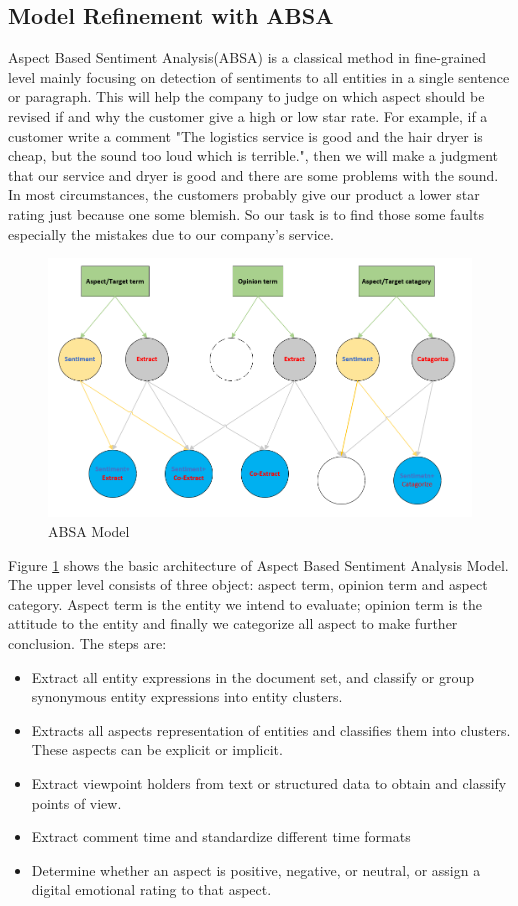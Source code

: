 \documentclass[12pt]{article}  %
\begin{document}
\subsection{Model Refinement with ABSA}
Aspect Based Sentiment Analysis(ABSA) is a classical method in fine-grained level mainly focusing on detection of sentiments to all entities in a single sentence or paragraph. This will help the company to judge on which aspect should be revised if and why the customer give a high or low star rate\cite{6}. For example, if a customer write a comment "The logistics service is good and the hair dryer is cheap, but the sound too loud which is terrible.", then we will make a judgment that our service and dryer is good and there are some problems with the sound. In most circumstances, the customers probably give our product a lower star rating just because one some blemish. So our task is to find those some faults especially the mistakes due to our company's service.

\begin{figure}[!htbp]
\centering
\includegraphics[width=.7\textwidth]{j.PNG}
\caption{ABSA Model}\label{fig:ABSA Model}
\end{figure}

Figure \ref{fig:ABSA Model} shows the basic architecture of Aspect Based Sentiment Analysis Model. The upper level consists of three object: aspect term, opinion term and aspect category. Aspect term is the entity we intend to evaluate; opinion term is the attitude to the entity and finally we categorize all aspect to make further conclusion. The steps are:

\begin{itemize}
\item Extract all entity expressions in the document set, and classify or group synonymous entity expressions into entity clusters.
\item Extracts all aspects representation of entities and classifies them into clusters. These aspects can be explicit or implicit.
\item Extract viewpoint holders from text or structured data to obtain and classify points of view.
\item Extract comment time and standardize different time formats
\item Determine whether an aspect is positive, negative, or neutral, or assign a digital emotional rating to that aspect.
\end{itemize}
\end{document}

